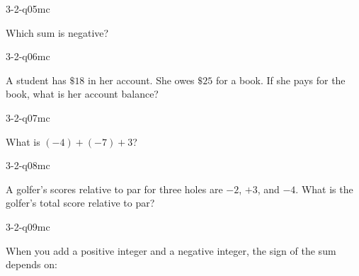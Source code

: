 \begin{practiceQuestion}{3-2-q05}{mc}
\begin{questionText}
Which sum is negative?
\end{questionText}
\end{practiceQuestion}

\begin{practiceQuestion}{3-2-q06}{mc}
\begin{questionText}
A student has $\$18$ in her account. She owes $\$25$ for a book. If she pays for the book, what is her account balance?
\end{questionText}
\end{practiceQuestion}

\begin{practiceQuestion}{3-2-q07}{mc}
\begin{questionText}
What is $(-4) + (-7) + 3$?
\end{questionText}
\end{practiceQuestion}

\begin{practiceQuestion}{3-2-q08}{mc}
\begin{questionText}
A golfer's scores relative to par for three holes are $-2$, $+3$, and $-4$. What is the golfer's total score relative to par?
\end{questionText}
\end{practiceQuestion}

\begin{practiceQuestion}{3-2-q09}{mc}
\begin{questionText}
When you add a positive integer and a negative integer, the sign of the sum depends on:
\end{questionText}
\end{practiceQuestion}

